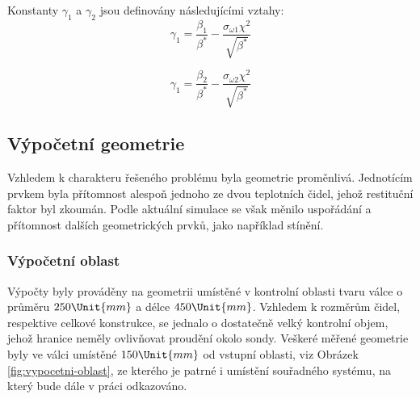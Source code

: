         \noindent Konstanty $\gamma _1$ a $\gamma _2$ jsou definovány následujícími vztahy:
        \begin{equation}
            \gamma _1 = \frac{\beta _1}{\beta ^*} - \frac{\sigma _{\omega 1} \chi ^2}{\sqrt{\beta ^*}}
        \end{equation}

        \begin{equation}
            \gamma _1 = \frac{\beta _2}{\beta ^*} - \frac{\sigma _{\omega 2} \chi ^2}{\sqrt{\beta ^*}}
        \end{equation}

    \newpage
    \subsection{Výpočetní geometrie}
        Vzhledem k charakteru řešeného problému byla geometrie proměnlivá. Jednotícím prvkem byla přítomnost alespoň jednoho ze dvou teplotních čidel, jehož restituční faktor byl zkoumán. Podle aktuální simulace se však měnilo uspořádání a přítomnost dalších geometrických prvků, jako například stínění.
    
        \subsubsection{Výpočetní oblast}
            Výpočty byly prováděny na geometrii umístěné v kontrolní oblasti tvaru válce o\,průměru $250 \Unit{mm}$ a délce $450 \Unit{mm}$. Vzhledem k rozměrům čidel, respektive celkové konstrukce, se jednalo o dostatečně velký kontrolní objem, jehož hranice neměly ovlivňovat proudění okolo sondy. Veškeré měřené geometrie byly ve válci umístěné $150 \Unit{mm}$ od vstupní oblasti, viz Obrázek \ref{fig:vypocetni-oblast}, ze kterého je patrné i umístění souřadného systému, na který bude dále v práci odkazováno.
            
